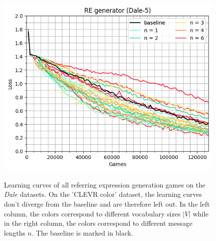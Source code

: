 \begin{figure}[ht!]
{        \includegraphics[width=0.485\linewidth]{figures/learning-curve_re-generator_dale-5_max-len.png}
        \label{fig:learning-curve_re-generator_dale-5_max-len}
    }
    \caption{Learning curves of all referring expression generation games on the \emph{Dale} datasets. On the 'CLEVR color' dataset, the learning curves don't diverge from the baseline and are therefore left out. In the left column, the colors correspond to different vocabulary sizes $|V|$ while in the right column, the colors correspond to different message lengths $n$. The baseline is marked in black.}
    \label{fig:learning-curves_re-generator}
\end{figure}


